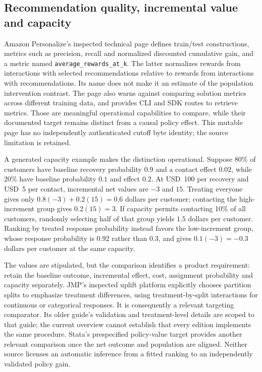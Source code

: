 \subsection{Recommendation quality, incremental value and capacity}

Amazon Personalize's inspected technical page defines train/test constructions,
metrics such as precision, recall and normalized discounted cumulative gain,
and a metric named \texttt{average\_rewards\_at\_k}. The latter normalizes
rewards from interactions with selected recommendations relative to rewards
from interactions with recommendations. Its name does not make it an estimate
of the population intervention contrast. The page also warns against comparing
solution metrics across different training data, and provides CLI and SDK
routes to retrieve metrics. Those are meaningful operational capabilities to
compare, while their documented target remains distinct from a causal policy
effect. This mutable page has no independently authenticated cutoff byte
identity; the source limitation is retained. \citep{exec16_cp_aws}

A generated capacity example makes the distinction operational. Suppose
80\% of customers have baseline recovery probability $0.9$ and a contact
effect $0.02$, while 20\% have baseline probability $0.1$ and effect $0.2$.
At USD~100 per recovery and USD~5 per contact, incremental net values are
$-3$ and $15$. Treating everyone gives only
$0.8(-3)+0.2(15)=0.6$ dollars per customer; contacting the high-increment
group gives $0.2(15)=3$. If capacity permits contacting 10\% of all customers,
randomly selecting half of that group yields $1.5$ dollars per customer.
Ranking by treated response probability instead favors the low-increment
group, whose response probability is $0.92$ rather than $0.3$, and gives
$0.1(-3)=-0.3$ dollars per customer at the same capacity.
\citep{exec16_cp_exact}

The values are stipulated, but the comparison identifies a product requirement:
retain the baseline outcome, incremental effect, cost, assignment probability
and capacity separately. JMP's inspected uplift platform explicitly chooses
partition splits to emphasize treatment differences, using treatment-by-split
interactions for continuous or categorical responses. It is consequently a
relevant targeting comparator. Its older guide's validation and treatment-level
details are scoped to that guide; the current overview cannot establish that
every edition implements the same procedure. Stata's prespecified policy-value
target provides another relevant comparison once the net outcome and population
are aligned. Neither source licenses an automatic inference from a fitted
ranking to an independently validated policy gain. \citep{exec13_ch_jmp_uplift,exec13_ch_stata}

